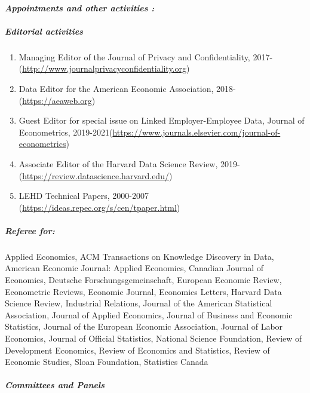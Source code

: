\documentclass[10pt,letterpaper]{report}
\begin{document}
\paragraph{\it \bf Appointments and other activities :}%
\subparagraph{Editorial activities}
\begin{enumerate}
	\item Managing Editor of the Journal of Privacy and Confidentiality, 2017-\newline (\url{http://www.journalprivacyconfidentiality.org})
	\item Data Editor for the American Economic Association, 2018- \newline (\url{https://aeaweb.org})
	\item Guest Editor for special issue on Linked Employer-Employee Data, Journal of Econometrics, 2019-2021\newline (\url{https://www.journals.elsevier.com/journal-of-econometrics})
	\item Associate Editor of the Harvard Data Science Review, 2019-\newline (\url{https://review.datascience.harvard.edu/})
	\item LEHD Technical Papers, 2000-2007 \newline (\url{https://ideas.repec.org/s/cen/tpaper.html})
\end{enumerate}
\subparagraph{ Referee for:}
  Applied Economics,
  ACM   Transactions on Knowledge Discovery in Data, 
  American Economic Journal: Applied Economics,
  Canadian Journal of Economics, 
  Deutsche Forschungsgemeinschaft,
  European Economic Review,  
  Econometric Reviews, 
  Economic Journal,  
  Economics Letters,
  Harvard Data Science Review,
  Industrial Relations, 
  Journal of the American Statistical Association,
  Journal of Applied Economics, 
  Journal of Business and Economic Statistics,  
  Journal of the European Economic Association,
  Journal of Labor   Economics, 
  Journal of Official Statistics,
  National Science Foundation,
  Review of Development Economics, 
  Review of Economics and Statistics,
  Review of Economic Studies,
  Sloan Foundation,
  Statistics Canada
\subparagraph{Committees and Panels} 
\end{document}
